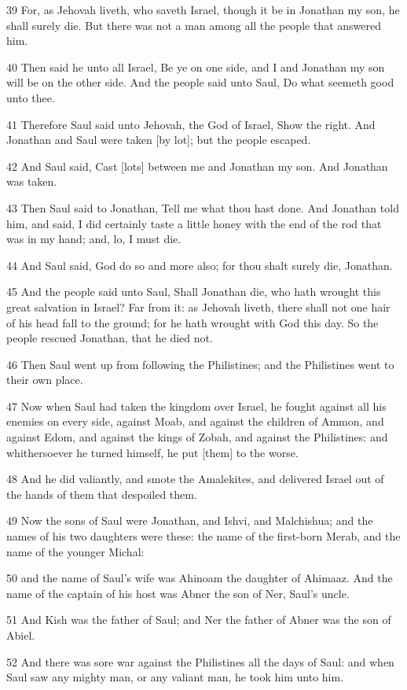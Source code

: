 \par 39 For, as Jehovah liveth, who saveth Israel, though it be in Jonathan my son, he shall surely die. But there was not a man among all the people that answered him.
\par 40 Then said he unto all Israel, Be ye on one side, and I and Jonathan my son will be on the other side. And the people said unto Saul, Do what seemeth good unto thee.
\par 41 Therefore Saul said unto Jehovah, the God of Israel, Show the right. And Jonathan and Saul were taken [by lot]; but the people escaped.
\par 42 And Saul said, Cast [lots] between me and Jonathan my son. And Jonathan was taken.
\par 43 Then Saul said to Jonathan, Tell me what thou hast done. And Jonathan told him, and said, I did certainly taste a little honey with the end of the rod that was in my hand; and, lo, I must die.
\par 44 And Saul said, God do so and more also; for thou shalt surely die, Jonathan.
\par 45 And the people said unto Saul, Shall Jonathan die, who hath wrought this great salvation in Israel? Far from it: as Jehovah liveth, there shall not one hair of his head fall to the ground; for he hath wrought with God this day. So the people rescued Jonathan, that he died not.
\par 46 Then Saul went up from following the Philistines; and the Philistines went to their own place.
\par 47 Now when Saul had taken the kingdom over Israel, he fought against all his enemies on every side, against Moab, and against the children of Ammon, and against Edom, and against the kings of Zobah, and against the Philistines: and whithersoever he turned himself, he put [them] to the worse.
\par 48 And he did valiantly, and smote the Amalekites, and delivered Israel out of the hands of them that despoiled them.
\par 49 Now the sons of Saul were Jonathan, and Ishvi, and Malchishua; and the names of his two daughters were these: the name of the first-born Merab, and the name of the younger Michal:
\par 50 and the name of Saul's wife was Ahinoam the daughter of Ahimaaz. And the name of the captain of his host was Abner the son of Ner, Saul's uncle.
\par 51 And Kish was the father of Saul; and Ner the father of Abner was the son of Abiel.
\par 52 And there was sore war against the Philistines all the days of Saul: and when Saul saw any mighty man, or any valiant man, he took him unto him.

